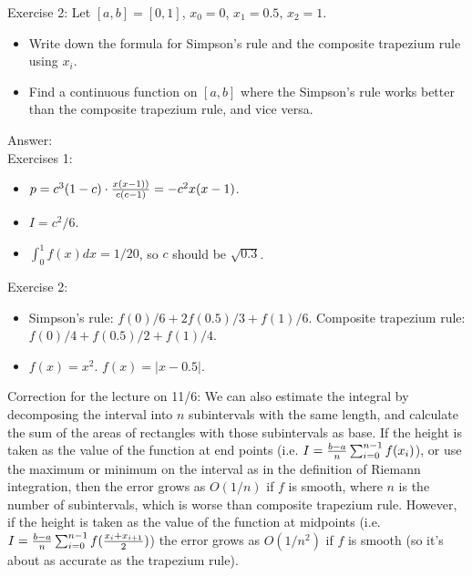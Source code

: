 \documentclass[20pt]{article} %
\theoremstyle{break}
\begin{document}
      Exercise 2: Let $[a, b]=[0, 1]$, $x_0=0$, $x_1=0.5$, $x_2=1$.
      \begin{itemize}
      \item Write down the formula for Simpson's rule and the composite trapezium rule using $x_i$.
      \item Find a continuous function on $[a, b]$ where the Simpson's rule works better than the composite trapezium rule, and vice versa.
      \end{itemize}
      
       Answer:\\

       Exercises 1:\\
       \begin{itemize}
       \item $p=c^3(1-c)\cdot {x(x-1))\over c(c-1)}=-c^2x(x-1)$.
       \item $I=c^2/6$. 
       \item $\int_0^1f(x)dx=1/20$, so $c$ should be $\sqrt{0.3}$.
       \end{itemize}
      
       Exercise 2:\\
       \begin{itemize}
       \item Simpson's rule: $f(0)/6+2f(0.5)/3+f(1)/6$. Composite trapezium rule: $f(0)/4+f(0.5)/2+f(1)/4$.
       \item $f(x)=x^2$. $f(x)=|x-0.5|$. 
       \end{itemize}

\newpage
       
       Correction for the lecture on 11/6: We can also estimate the integral by decomposing the interval into $n$ subintervals with the same length, and calculate the sum of the areas of rectangles with those subintervals as base. If the height is taken as the value of the function at end points (i.e. $I={b-a\over n}\sum_{i=0}^{n-1}f(x_i)$), or use the maximum or minimum on the interval as in the definition of Riemann integration, then the error grows as $O(1/n)$ if $f$ is smooth, where $n$ is the number of subintervals, which is worse than composite trapezium rule. However, if the height is taken as the value of the function at midpoints (i.e. $I={b-a\over n}\sum_{i=0}^{n-1}f({x_i+x_{i+1}\over 2})$) the error grows as $O(1/n^2)$ if $f$ is smooth (so it's about as accurate as the trapezium rule).
       
  \newpage     
\end{document}
